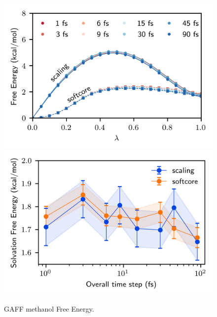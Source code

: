 \documentclass[
aip,
jcp,
reprint,
]{revtex4-1}
\begin{document}
\begin{figure}
	\centering
	\includegraphics{gaff_methanol_vdw_free_energy_profiles}
	\includegraphics{gaff_methanol_vdw_free_energies}
	\caption{GAFF methanol Free Energy.}
	\label{fig:methanol vdw free energy}
\end{figure}
\end{document}
